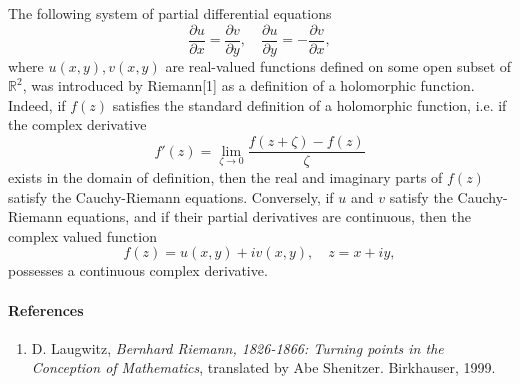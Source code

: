 \documentclass[12pt]{article}
\newcommand{\reals}{\mathbb{R}}
\begin{document}
The following system of partial differential
equations 
$$
\frac{\partial u}{\partial x} = \frac{\partial v}{\partial y},\quad
\frac{\partial u}{\partial y} = -\frac{\partial v}{\partial x},
$$
where $u(x,y), v(x,y)$ are real-valued functions defined on some
open subset of $\reals^2$, was introduced by Riemann[1] as a
definition of a holomorphic function.  Indeed, if $f(z)$ satisfies the
standard definition of a holomorphic function, i.e. if the
complex derivative
$$f'(z) = \lim_{\zeta\rightarrow 0} \frac{f(z+\zeta)-f(z)}{\zeta}$$
exists in the domain of definition, then the real and imaginary parts
of $f(z)$
satisfy the Cauchy-Riemann equations.
Conversely, if $u$ and $v$ satisfy the Cauchy-Riemann equations, and if their
partial derivatives are continuous, then the complex valued function
$$f(z) = u(x,y) + i v(x,y),\quad z=x+i y,$$
possesses a continuous complex derivative.

\paragraph{References}

\begin{enumerate}
\item D. Laugwitz, \emph{Bernhard Riemann, 1826-1866:
 Turning points in the Conception of
 Mathematics}, translated by Abe Shenitzer. Birkhauser, 1999.
\end{enumerate}
\end{document}
